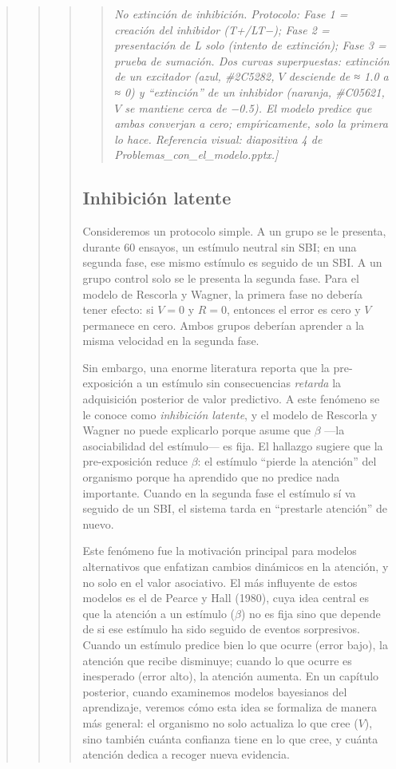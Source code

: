 \documentclass[
  letterpaper,
  DIV=11,
  numbers=noendperiod]{scrreprt}
\begin{document}
\begin{tcolorbox}[enhanced jigsaw, toprule=.15mm, arc=.35mm, colback=white, opacityback=0, colframe=quarto-callout-note-color-frame, breakable, rightrule=.15mm, left=2mm, leftrule=.75mm, bottomrule=.15mm]
\begin{quote}
\begin{quote}
\begin{quote}
\begin{quote}
\emph{No extinción de inhibición. Protocolo: Fase 1 = creación del
inhibidor (T+/LT−); Fase 2 = presentación de L solo (intento de
extinción); Fase 3 = prueba de sumación. Dos curvas superpuestas:
extinción de un excitador (azul, \#2C5282, \(V\) desciende de ≈ 1.0 a ≈
0) y ``extinción'' de un inhibidor (naranja, \#C05621, \(V\) se mantiene
cerca de −0.5). El modelo predice que ambas converjan a cero;
empíricamente, solo la primera lo hace. Referencia visual: diapositiva 4
de Problemas\_con\_el\_modelo.pptx.{]}}
\end{quote}

\subsection{Inhibición latente}\label{inhibiciuxf3n-latente}

Consideremos un protocolo simple. A un grupo se le presenta, durante 60
ensayos, un estímulo neutral sin SBI; en una segunda fase, ese mismo
estímulo es seguido de un SBI. A un grupo control solo se le presenta la
segunda fase. Para el modelo de Rescorla y Wagner, la primera fase no
debería tener efecto: si \(V = 0\) y \(R = 0\), entonces el error es
cero y \(V\) permanece en cero. Ambos grupos deberían aprender a la
misma velocidad en la segunda fase.

Sin embargo, una enorme literatura reporta que la pre-exposición a un
estímulo sin consecuencias \emph{retarda} la adquisición posterior de
valor predictivo. A este fenómeno se le conoce como \emph{inhibición
latente}, y el modelo de Rescorla y Wagner no puede explicarlo porque
asume que \(\beta\) ---la asociabilidad del estímulo--- es fija. El
hallazgo sugiere que la pre-exposición reduce \(\beta\): el estímulo
``pierde la atención'' del organismo porque ha aprendido que no predice
nada importante. Cuando en la segunda fase el estímulo sí va seguido de
un SBI, el sistema tarda en ``prestarle atención'' de nuevo.

Este fenómeno fue la motivación principal para modelos alternativos que
enfatizan cambios dinámicos en la atención, y no solo en el valor
asociativo. El más influyente de estos modelos es el de Pearce y Hall
(1980), cuya idea central es que la atención a un estímulo (\(\beta\))
no es fija sino que depende de si ese estímulo ha sido seguido de
eventos sorpresivos. Cuando un estímulo predice bien lo que ocurre
(error bajo), la atención que recibe disminuye; cuando lo que ocurre es
inesperado (error alto), la atención aumenta. En un capítulo posterior,
cuando examinemos modelos bayesianos del aprendizaje, veremos cómo esta
idea se formaliza de manera más general: el organismo no solo actualiza
lo que cree (\(V\)), sino también cuánta confianza tiene en lo que cree,
y cuánta atención dedica a recoger nueva evidencia.


\end{quote}
\end{quote}
\end{quote}
\end{tcolorbox}
\end{document}
